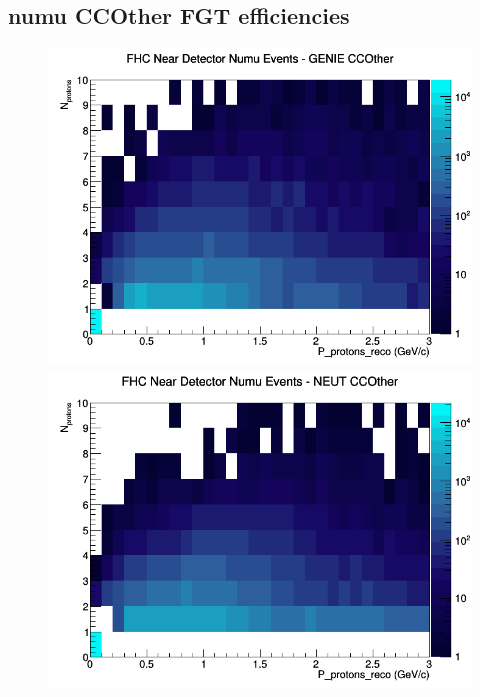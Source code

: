 \subsection{numu CCOther FGT efficiencies}
\begin{figure}[h]
\includegraphics[width=\linewidth]{eff_N_P/FGT/protons/CCOther_FHC_ND_numu_N_P_GENIE.png}
\endminipage
{}
\includegraphics[width=\linewidth]{eff_N_P/FGT/protons/CCOther_FHC_ND_numu_N_P_NEUT.png}
\endminipage
{}

\end{figure}
